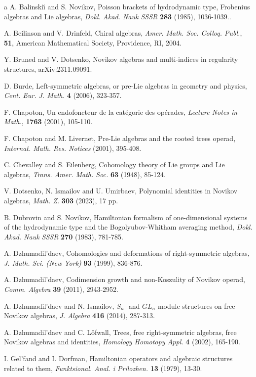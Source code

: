 \documentclass[12pt]{amsart}
\theoremstyle{definition}
\begin{document}
\begin{thebibliography}{a}
A. Balinski{\u{\i}} and S. Novikov, Poisson brackets of hydrodynamic type, Frobenius algebras and Lie algebras, {\em Dokl. Akad. Nauk SSSR} {\bf 283} (1985), 1036-1039..

A. Beilinson and V.  Drinfeld,  Chiral algebras, {\em Amer. Math. Soc. Colloq. Publ.}, {\bf 51}, American Mathematical Society, Providence, RI, 2004.

Y. Bruned and V. Dotsenko, Novikov algebras and multi-indices in regularity structures, arXiv:2311.09091.

D. Burde, Left-symmetric algebras, or pre-Lie algebras in geometry and physics, \emph{Cent. Eur. J. Math.} {\bf 4} (2006), 323-357.

F. Chapoton, Un endofoncteur de la cat\'egorie des op\'erades, {\em Lecture Notes in Math.}, {\bf 1763} (2001), 105-110.

F. Chapoton and M. Livernet, Pre-Lie algebras and the rooted trees operad, {\em Internat. Math. Res. Notices} (2001), 395-408.

C. Chevalley and S. Eilenberg, Cohomology theory of Lie groups and Lie algebras, \emph{Trans. Amer. Math. Soc.} {\bf 63} (1948), 85-124.

V. Dotsenko, N. Ismailov and U. Umirbaev, Polynomial identities in Novikov algebras, {\em Math. Z.} {\bf 303} (2023), 17 pp.

B. Dubrovin and S. Novikov, Hamiltonian formalism of one-dimensional systems of the hydrodynamic type and the Bogolyubov-Whitham averaging method, {\em Dokl. Akad. Nauk SSSR} {\bf 270} (1983), 781-785.

A. Dzhumadil'daev, Cohomologies and deformations of right-symmetric algebras, {\em J. Math. Sci. (New York)} {\bf 93} (1999), 836-876.

A. Dzhumadil'daev, Codimension growth and non-Koszulity of Novikov operad, {\em Comm. Algebra} {\bf 39} (2011), 2943-2952.	

A. Dzhumadil'daev and N. Ismailov, $S_n$- and $GL_n$-module structures on free Novikov algebras, {\em J. Algebra} {\bf 416} (2014), 287-313.

A. Dzhumadil'daev and C. L\"ofwall, Trees, free right-symmetric algebras, free Novikov algebras and identities, {\em Homology Homotopy Appl.} {\bf 4} (2002), 165-190.

I. Gel'fand and I. Dorfman, Hamiltonian operators and algebraic structures related to them, {\em Funktsional. Anal. i Prilozhen.} {\bf 13} (1979), 13-30.


\end{thebibliography}
\end{document}
